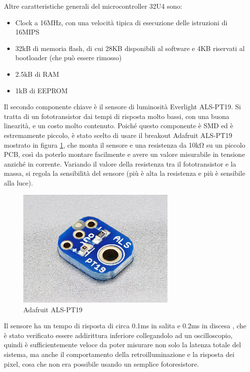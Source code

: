 Altre caratteristiche generali del microcontroller 32U4 sono:
\begin{itemize}
	\item Clock a 16MHz, con una velocità tipica di esecuzione delle istruzioni di 16MIPS
	\item 32kB di memoria flash, di cui 28KB disponibili al software e 4KB riservati al bootloader (che può essere rimosso)
	\item 2.5kB di RAM
	\item 1kB di EEPROM
\end{itemize}

Il secondo componente chiave è il sensore di luminosità Everlight ALS-PT19. Si tratta di un fototransistor dai tempi di risposta molto bassi, con una buona linearità, e un costo molto contenuto. Poiché questo componente è SMD ed è estremamente piccolo, è stato scelto di usare il breakout Adafruit ALS-PT19 mostrato in figura \ref{fig:adafruit_pt19}, che monta il sensore e una resistenza da 10k\si{\ohm} su un piccolo PCB, così da poterlo montare facilmente e avere un valore misurabile in tensione anziché in corrente. Variando il valore della resistenza tra il fototransistor e la massa, si regola la sensibilità del sensore (più è alta la resistenza e più è sensibile alla luce).
\begin{figure}[h]
	\centering
	\includegraphics[width=0.7\textwidth]{Chapter03/res/als-pt19.jpg}
	\caption{Adafruit ALS-PT19}
	\label{fig:adafruit_pt19}
\end{figure}

Il sensore ha un tempo di risposta di circa 0.1ms in salita e 0.2ms in discesa \cite{als_pt19_datasheet}, che è stato verificato essere addirittura inferiore collegandolo ad un oscilloscopio, quindi è sufficientemente veloce da poter misurare non solo la latenza totale del sistema, ma anche il comportamento della retroilluminazione e la risposta dei pixel, cosa che non era possibile usando un semplice fotoresistore.

